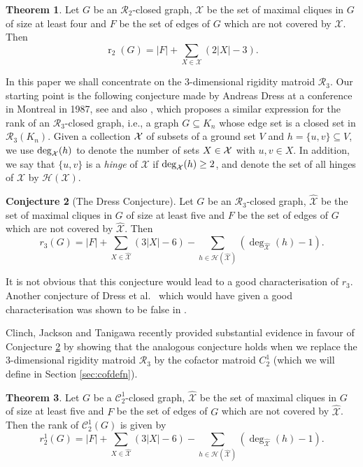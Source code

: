 \documentclass[11pt,a4paper]{article}
\theoremstyle{definition}
\newtheorem{theorem}{Theorem}[section]
\newtheorem{conjecture}[theorem]{Conjecture}
\DeclareMathOperator{\rr}{r}
\newcommand{\cR}{\mathcal{R}}
\newcommand{\cX}{\mathcal{X}}
\newcommand{\cH}{\mathcal{H}}
\newcommand{\XX}{\mathcal{X}}
\newcommand{\hXX}{\hat{\mathcal{X}}}
\newcommand{\cC}{\mathcal{C}}
\begin{document}
\begin{theorem} 
\cite{LY}
\label{thm:lamanrank1} Let $G$ be an $\mathcal{R}_2$-closed graph,
$\mathcal{X}$ be the set of maximal cliques in $G$ of size at least four and $F$ be the set of edges of $G$ which are not covered by $\XX$. 
Then $$\rr_2(G)=|F|+\sum_{X\in \mathcal{X}}(2|X|-3).$$
\end{theorem}





In this paper we shall concentrate on the 3-dimensional rigidity matroid $\cR_3$. 
Our starting point is the following conjecture made by Andreas Dress 
at a conference in Montreal 
in 1987, see \cite{GSS} and also \cite{CDT,Taycon}, which proposes a similar expression for the rank of  an $\cR_3$-closed graph, i.e., a graph $G\subseteq K_n$  whose edge set is a closed set in $\cR_3(K_n)$. 
Given  a collection $\cal X$  of subsets of a ground set $V$ and  $h=\{u,v\}\subseteq  V$, we use
$\deg_{\cal X}(h)$ to denote the number of sets $X\in {\cal X}$ with $u,v\in X$. %
In addition, we say that $\{u,v\}$ is a {\em hinge} of $\cX$ if $\deg_{\cal X}(h)\geq 2$, and denote the set of all hinges of $\cX$ by $\cH(\cX)$.

\begin{conjecture}[The Dress Conjecture]\label{con:dress}
Let $G$ be an $\cR_3$-closed graph, $\hXX$ be the set of maximal cliques in $G$ of size at least five and $F$ be the set of edges of $G$ which are not covered by $\hXX$. Then 
\begin{equation}\label{eq:dress}
r_3(G)=|F|+\sum_{X\in \hXX}(3|X|-6)-\sum_{h\in \mathcal{H(\hXX)}}(\deg_{\hXX}(h)-1).
\end{equation}
\end{conjecture}
\noindent
It is not obvious that this conjecture would lead to a good characterisation of $r_3$. Another conjecture of Dress et al.\ \cite{Dress1} which would have given a good characterisation was shown to be false in \cite{JJdress}.

Clinch, Jackson and Tanigawa \cite{CJT} recently provided substantial evidence in favour of Conjecture \ref{con:dress} by showing that the analogous conjecture  holds when we replace the 3-dimensional rigidity matroid $\cR_3$ by the cofactor matroid $C_2^1$ (which we will define in Section \ref{sec:cofdefn}).

\begin{theorem}\label{thm:cjt}
\cite[Theorem 6.3]{CJT}
Let $G$ be a $\cC_2^1$-closed graph, $\hXX$ be the set of maximal cliques in $G$ of size at least five and $F$ be the set of edges of $G$ which are not covered by $\hXX$. Then the rank of $\cC_2^1(G)$ is given by
$$r_2^1(G)=|F|+\sum_{X\in \hXX}(3|X|-6)-\sum_{h\in \cH(\hXX)}(\deg_{\hXX}(h)-1).$$
\end{theorem}
\end{document}
